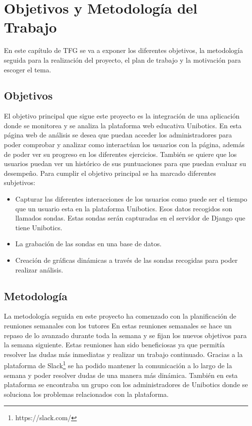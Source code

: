 \chapter{Objetivos y Metodología del Trabajo}\label{objetivos}

En este capítulo de TFG se va a exponer los diferentes objetivos, la metodología seguida para la realización del proyecto, el plan de trabajo y la motivación para escoger el tema.


\section{Objetivos}

El objetivo principal que sigue este proyecto es la integración de una aplicación donde se monitorea y se analiza la plataforma web educativa Unibotics. En esta página web de análisis se desea que puedan acceder los administradores para poder comprobar y analizar como interactúan los usuarios con la página, además de poder ver su progreso en los diferentes ejercicios. También se quiere que los usuarios puedan ver un histórico de sus puntuaciones para que puedan evaluar su desempeño. Para cumplir el objetivo principal se ha marcado diferentes subjetivos:

\begin{itemize}
\item Capturar las diferentes interacciones de los usuarios como puede ser el tiempo que un usuario esta en la plataforma Unibotics. Esos datos recogidos son llamados sondas. Estas sondas serán capturadas en el servidor de Django que tiene Unibotics.

\item La grabación de las sondas en una base de datos.

\item Creación de gráficas dinámicas a través de las sondas recogidas para poder realizar análisis.
\end{itemize}

\newpage

 
\section{Metodología}

La metodología seguida en este proyecto ha comenzado con la planificación de reuniones semanales con los tutores En estas reuniones semanales se hace un repaso de lo avanzado durante toda la semana y se fijan los nuevos objetivos para la semana siguiente. Estas reuniones han sido beneficiosas ya que permitía resolver las dudas más inmediatas y realizar un trabajo continuado. Gracias a la plataforma de Slack\footnote{https://slack.com/} se ha podido mantener la comunicación a lo largo de la semana y poder resolver dudas de una manera más dinámica. También en esta plataforma se encontraba un grupo con los administradores de Unibotics donde se soluciona los problemas relacionados con la plataforma.\\

